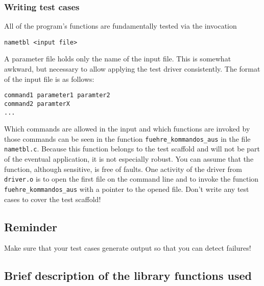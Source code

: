 \subsubsection*{Writing test cases}

All of the program's functions are fundamentally tested via 
the invocation 
\begin{verbatim}
nametbl <input file>
\end{verbatim}
A parameter file holds only the name of the input file.
This is somewhat awkward, but necessary to allow applying 
the test driver consistently.
The format of the input file is as follows:
\begin{verbatim}
command1 parameter1 paramter2
command2 paramterX
...
\end{verbatim}

Which commands are allowed in the input and which functions are
invoked by those commands can be seen in the function 
{\tt fuehre\_kommandos\_aus} in the file {\tt nametbl.c}.
Because this function belongs to the test scaffold and will not
be part of the eventual application, it is not especially robust.
You can assume that the function, although sensitive, is free of
faults. 
One activity of the driver from {\tt driver.o} is to open the first
file on the command line and to invoke the function {\tt
fuehre\_kommandos\_aus} with a pointer to the opened file.
Don't write any test cases to cover the test scaffold!


\subsection*{Reminder}

Make sure that your test cases generate output so that you can
detect failures!


\subsection*{Brief description of the library functions used}

